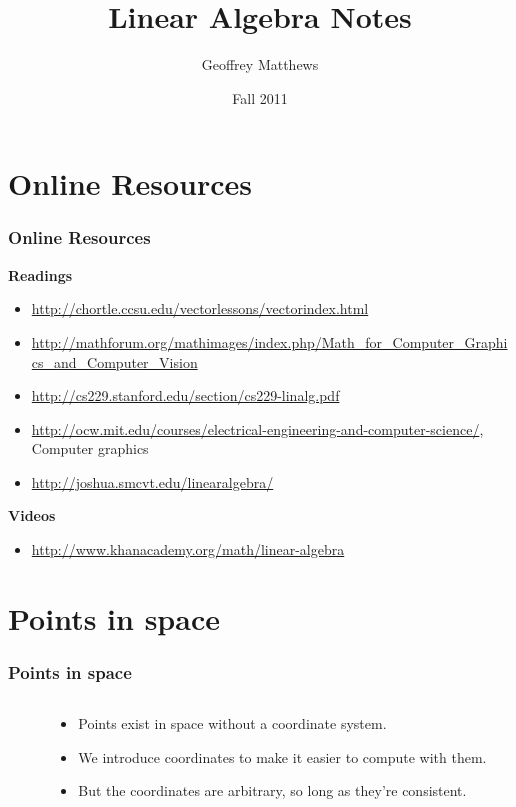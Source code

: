 \documentclass[]{beamer}
\title[Linear Algebra Notes II]
{
Linear Algebra Notes
}
\author[Geoffrey Matthews]
{Geoffrey Matthews}
\institute[WWU/CS]
{
  Department of Computer Science\\
  Western Washington University
}
\date{Fall 2011}
\newcommand{\myref}[1]{\small\item\url{#1}}
\newcommand{\myreff}[1]{\scriptsize\item\url{#1}}
\newcommand{\sect}[1]{
\section{#1}
\begin{frame}[fragile]\frametitle{#1}
}
\newcommand{\point}[2]{
  \fill (#1) node (#2) {} circle (2pt) node[anchor=south] {$#2$};
  }
\newcommand{\coords}{
      \draw[dotted,step=1] (0,0) grid (9.9,9.9);
      \draw[thick,<->] (10,0) %
      -- (0,0) -- (0,10) %
      ;
      \foreach \x in {0,1,2,3,4,5,6,7,8,9}
        \draw (\x ,2pt) -- (\x ,-2pt) node[anchor=north] {$\x$};
      \foreach \y in {0,1,2,3,4,5,6,7,8,9}
        \draw (2pt,\y) -- (-2pt,\y ) node[anchor=east] {$\y$};
}
\begin{document}
\begin{frame}
  \titlepage
\end{frame}



\sect{Online Resources}

{\bf Readings}
\begin{itemize}
  \myref{http://chortle.ccsu.edu/vectorlessons/vectorindex.html}
  \myref{http://mathforum.org/mathimages/index.php/Math_for_Computer_Graphics_and_Computer_Vision}
\myref{http://cs229.stanford.edu/section/cs229-linalg.pdf}

\myreff{http://ocw.mit.edu/courses/electrical-engineering-and-computer-science/}, Computer graphics
\myref{http://joshua.smcvt.edu/linearalgebra/}
\end{itemize}
{\bf Videos}
\begin{itemize}
\myref{http://www.khanacademy.org/math/linear-algebra}
\end{itemize}
\end{frame}

\sect{Points in space}
\begin{columns}[onlytextwidth]
\begin{column}{0.6\textwidth}
  \tikzset{>=latex,x=0.6cm,y=0.6cm}
\end{column}
\begin{column}{0.4\textwidth}
  \begin{itemize}
  \item Points exist in space without a coordinate system.
  \item We introduce coordinates to make it easier to compute with them.
  \item But the coordinates are arbitrary, so long as they're consistent.
  \end{itemize}
  \end{column}
\end{columns}
\end{frame}
\end{document}
